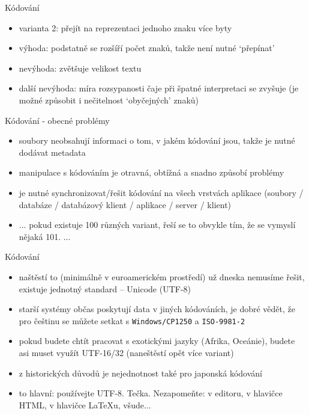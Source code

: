 \documentclass{beamer}
\begin{document}
\begin{frame}{Kódování}
  \begin{itemize}
    \item varianta 2: přejít na reprezentaci jednoho znaku více byty
    \item výhoda: podstatně se rozšíří počet znaků, takže není nutné `přepínat'
    \item nevýhoda: zvětšuje velikost textu
    \item další nevýhoda: míra rozsypanosti čaje při špatné interpretaci se zvyšuje (je možné způsobit i nečitelnost `obyčejných' znaků)
  \end{itemize}
\end{frame}

\begin{frame}{Kódování - obecné problémy}
  \begin{itemize}
    \item soubory neobsahují informaci o tom, v jakém kódování jsou, takže je nutné dodávat metadata
    \item manipulace s kódováním je otravná, obtížná a snadno způsobí problémy
    \item je nutné synchronizovat/řešit kódování na všech vrstvách aplikace (soubory / databáze / databázový klient / aplikace / server / klient)
    \item ... pokud existuje 100 různých variant, řeší se to obvykle tím, že se vymyslí nějaká 101. ...
  \end{itemize}
\end{frame}

\begin{frame}{Kódování}
  \begin{itemize}
    \item naštěstí to (minimálně v euroamerickém prostředí) už dneska nemusíme řešit, existuje jednotný standard -- Unicode (UTF-8)
    \item starší systémy občas poskytují data v jiných kódováních, je dobré vědět, že pro češtinu se můžete setkat s \texttt{Windows/CP1250} a \texttt{ISO-9981-2}
    \item pokud budete chtít pracovat s exotickými jazyky (Afrika, Oceánie), budete asi muset využít UTF-16/32 (naneštěstí opět více variant)
    \item z historických důvodů je nejednotnost také pro japonská kódování
    \item to hlavní: používejte UTF-8. Tečka. Nezapomeňte: v editoru, v hlavičce HTML, v hlavičce LaTeXu, všude...
  \end{itemize}
\end{frame}
\end{document}
